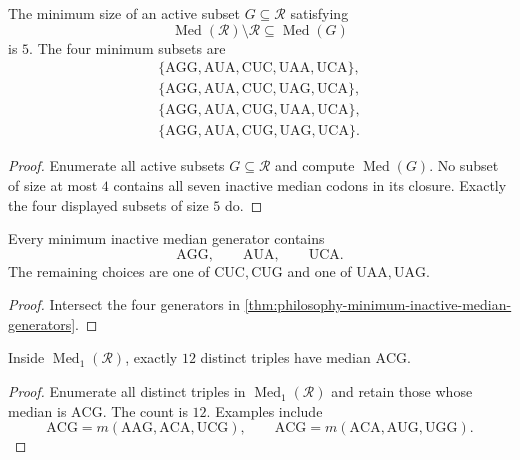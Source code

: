 \begin{theorem}
\label{thm:philosophy-minimum-inactive-median-generators}
The minimum size of an active subset $G\subseteq\mathcal{R}$ satisfying
$$
  \operatorname{Med}(\mathcal{R})\setminus\mathcal{R}
  \subseteq
  \operatorname{Med}(G)
$$
is $5$. The four minimum subsets are
$$
\begin{gathered}
  \{\mathrm{AGG},\mathrm{AUA},\mathrm{CUC},\mathrm{UAA},\mathrm{UCA}\},\\
  \{\mathrm{AGG},\mathrm{AUA},\mathrm{CUC},\mathrm{UAG},\mathrm{UCA}\},\\
  \{\mathrm{AGG},\mathrm{AUA},\mathrm{CUG},\mathrm{UAA},\mathrm{UCA}\},\\
  \{\mathrm{AGG},\mathrm{AUA},\mathrm{CUG},\mathrm{UAG},\mathrm{UCA}\}.
\end{gathered}
$$
\end{theorem}
\begin{proof}
Enumerate all active subsets $G\subseteq\mathcal{R}$ and compute
$\operatorname{Med}(G)$. No subset of size at most $4$ contains all
seven inactive median codons in its closure. Exactly the four displayed
subsets of size $5$ do.
\end{proof}

\begin{corollary}
\label{cor:philosophy-inactive-leakage-core}
Every minimum inactive median generator contains
$$
  \mathrm{AGG},\qquad \mathrm{AUA},\qquad \mathrm{UCA}.
$$
The remaining choices are one of $\mathrm{CUC},\mathrm{CUG}$ and one of
$\mathrm{UAA},\mathrm{UAG}$.
\end{corollary}
\begin{proof}
Intersect the four generators in
\autoref{thm:philosophy-minimum-inactive-median-generators}.
\end{proof}

\begin{theorem}
\label{thm:philosophy-acg-second-layer-derivations}
Inside $\operatorname{Med}_{1}(\mathcal{R})$, exactly $12$ distinct
triples have median $\mathrm{ACG}$.
\end{theorem}
\begin{proof}
Enumerate all distinct triples in $\operatorname{Med}_{1}(\mathcal{R})$
and retain those whose median is $\mathrm{ACG}$. The count is $12$.
Examples include
$$
  \mathrm{ACG}=m(\mathrm{AAG},\mathrm{ACA},\mathrm{UCG}),
  \qquad
  \mathrm{ACG}=m(\mathrm{ACA},\mathrm{AUG},\mathrm{UGG}).
$$
\end{proof}

